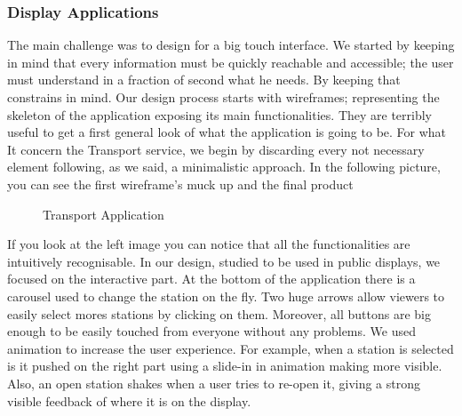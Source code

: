 \documentclass[]{usiinfbachelorproject}
\begin{document}
\subsubsection{Display Applications}
The main challenge was to design for a big touch interface. We started by keeping in mind that every information must be quickly reachable and accessible; the user must understand in a fraction of second what he needs. By keeping that constrains in mind.
Our design process starts with wireframes; representing the skeleton of the application exposing its main functionalities. They are terribly useful to get a first general look of what the application is going to be. For what It concern the Transport service, we begin by discarding every not necessary element following, as we said, a minimalistic approach. In the following picture, you can see the first wireframe's muck up and the final product
\begin{figure}[H]
  \centering
  \hfill
  \caption{Transport Application}
\end{figure} 
If you look at the left image you can notice that all the functionalities are intuitively recognisable. In our design, studied to be used in public displays, we focused on the interactive part. At the bottom of the application there is a carousel used to change the station on the fly. Two huge arrows allow viewers to easily select mores stations by clicking on them. Moreover, all buttons are big enough to be easily touched from everyone without any problems.
We used animation to increase the user experience. For example, when a station is selected is it pushed on the right part using a slide-in in animation making more visible. Also, an open station shakes when a user tries to re-open it, giving a strong visible feedback of where it is on the display. 
\end{document}
